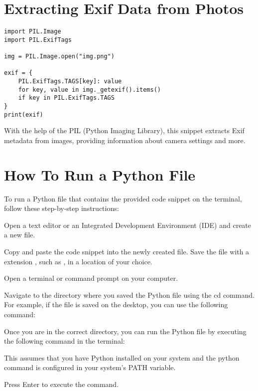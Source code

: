 \section{Extracting Exif Data from Photos}

\begin{lstlisting}
import PIL.Image
import PIL.ExifTags

img = PIL.Image.open("img.png")

exif = {
    PIL.ExifTags.TAGS[key]: value
    for key, value in img._getexif().items()
    if key in PIL.ExifTags.TAGS
}
print(exif)
\end{lstlisting}

With the help of the PIL (Python Imaging Library), this snippet extracts Exif metadata from images, providing information about camera settings and more.

\section{How To Run a Python File}

To run a Python file that contains the provided code snippet on the terminal, follow these step-by-step instructions:

Open a text editor or an Integrated Development Environment (IDE) and create a new file.

Copy and paste the code snippet into the newly created file.
Save the file with a extension , such as , in a location of your choice.

Open a terminal or command prompt on your computer.

Navigate to the directory where you saved the Python file using the cd command. For example, if the file is saved on the desktop, you can use the following command:

\medskip


\medskip


Once you are in the correct directory, you can run the Python file by executing the following command in the terminal:

\medskip


\medskip

This assumes that you have Python installed on your system and the python command is configured in your system's PATH variable.

Press Enter to execute the command.

